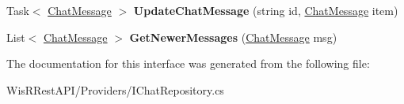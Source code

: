 \begin{DoxyCompactItemize}
\item 
\hypertarget{interface_wis_r_rest_a_p_i_1_1_providers_1_1_i_chat_repository_a604502b655a19ad7548437d4d22e2cea}{}Task$<$ \hyperlink{class_wis_r_1_1_domain_model_1_1_chat_message}{Chat\+Message} $>$ {\bfseries Update\+Chat\+Message} (string id, \hyperlink{class_wis_r_1_1_domain_model_1_1_chat_message}{Chat\+Message} item)\label{interface_wis_r_rest_a_p_i_1_1_providers_1_1_i_chat_repository_a604502b655a19ad7548437d4d22e2cea}

\item 
\hypertarget{interface_wis_r_rest_a_p_i_1_1_providers_1_1_i_chat_repository_a48cda9a3c5935f75c05e16b9fbaf24e9}{}List$<$ \hyperlink{class_wis_r_1_1_domain_model_1_1_chat_message}{Chat\+Message} $>$ {\bfseries Get\+Newer\+Messages} (\hyperlink{class_wis_r_1_1_domain_model_1_1_chat_message}{Chat\+Message} msg)\label{interface_wis_r_rest_a_p_i_1_1_providers_1_1_i_chat_repository_a48cda9a3c5935f75c05e16b9fbaf24e9}

\end{DoxyCompactItemize}


The documentation for this interface was generated from the following file\+:\begin{DoxyCompactItemize}
\item 
Wis\+R\+Rest\+A\+P\+I/\+Providers/I\+Chat\+Repository.\+cs\end{DoxyCompactItemize}
